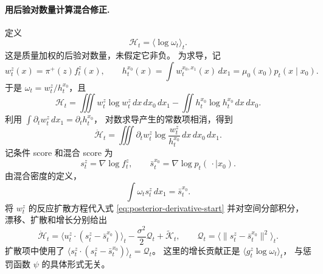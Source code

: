 \documentclass[UTF8,a4paper,11pt,fontset=fandol]{ctexart}
\begin{document}
\paragraph{用后验对数量计算混合修正.}
定义
\begin{equation}
\mathcal H_t=\langle\log\omega_t\rangle_t.
\label{eq:posterior-log}
\end{equation}
这是质量加权的后验对数量，未假定它非负。
为求导，记
\begin{equation}
w_t^z(x)=\pi^+(z)f_t^z(x),\qquad
h_t^{x_0}(x)=\int w_t^{x_0,x_1}(x)\,dx_1
=\mu_0(x_0)p_t(x\mid x_0).
\end{equation}
于是 $\omega_t=w_t^z/h_t^{x_0}$，且
\begin{equation}
\mathcal H_t
=\iiint w_t^z\log w_t^z\,dx\,dx_0\,dx_1
-\iint h_t^{x_0}\log h_t^{x_0}\,dx\,dx_0.
\label{eq:posterior-entropy-difference}
\end{equation}
利用 $\int\partial_tw_t^z\,dx_1=\partial_th_t^{x_0}$，
对数求导产生的常数项相消，得到
\begin{equation}
\dot{\mathcal H}_t
=\iiint\partial_tw_t^z\log\frac{w_t^z}{h_t^{x_0}}
\,dx\,dx_0\,dx_1.
\label{eq:posterior-derivative-start}
\end{equation}
记条件 score 和混合 score 为
\begin{equation}
s_t^z=\nabla\log f_t^z,\qquad
\bar s_t^{x_0}=\nabla\log p_t(\,\cdot\mid x_0).
\end{equation}
由混合密度的定义，
\begin{equation}
\int\omega_t s_t^z\,dx_1=\bar s_t^{x_0}.
\label{eq:score-mixture-identity}
\end{equation}
将 $w_t^z$ 的反应扩散方程代入式 \eqref{eq:posterior-derivative-start}
并对空间分部积分，漂移、扩散和增长分别给出
\begin{equation}
\dot{\mathcal H}_t
=\langle u_t^z\cdot(s_t^z-\bar s_t^{x_0})\rangle_t
-\frac{\sigma^2}{2}\mathcal Q_t+\widetilde{\mathcal K}_t,
\qquad
\mathcal Q_t=\langle\|s_t^z-\bar s_t^{x_0}\|^2\rangle_t.
\label{eq:posterior-derivative}
\end{equation}
扩散项中使用了
$\langle s_t^z\cdot(s_t^z-\bar s_t^{x_0})\rangle_t=\mathcal Q_t$。
这里的增长贡献正是 $\langle g_t^z\log\omega_t\rangle_t$，
与惩罚函数 $\psi$ 的具体形式无关。
\end{document}
